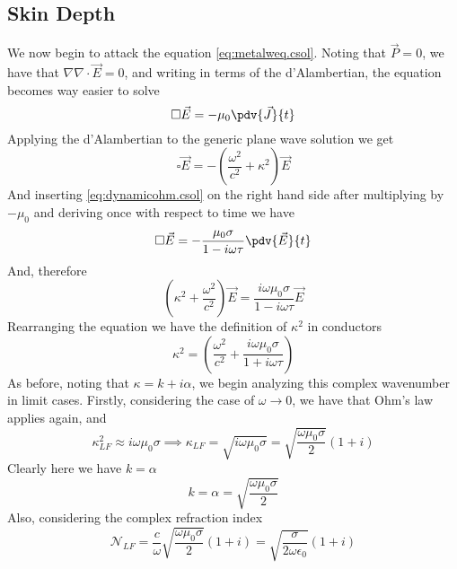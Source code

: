 \documentclass[../electromagnetism.tex]{subfiles}
\begin{document}
\subsection{Skin Depth}
We now begin to attack the equation \eqref{eq:metalweq.csol}. Noting that $\vec{P}=0$, we have that $\nabla\nabla\cdot\vec{E}=0$, and writing in terms of the d'Alambertian, the equation becomes way easier to solve
\begin{equation}
	\square\vec{E}=-\mu_0\pdv{\vec{J}}{t}
	\label{eq:metaleq.csol}
\end{equation}
Applying the d'Alambertian to the generic plane wave solution we get 
\begin{equation*}
	\square\vec{E}=-\left( \frac{\omega^2}{c^2}+\kappa^2 \right)\vec{E}
\end{equation*}
And inserting \eqref{eq:dynamicohm.csol} on the right hand side after multiplying by $-\mu_0$ and deriving once with respect to time we have
\begin{equation}
	\square\vec{E}=-\frac{\mu_0\sigma}{1-i\omega\tau}\pdv{\vec{E}}{t}
	\label{eq:pdetosolve.csol}
\end{equation}
And, therefore
\begin{equation*}
	\left( \kappa^2+\frac{\omega^2}{c^2} \right)\vec{E}=\frac{i\omega\mu_0\sigma}{1-i\omega\tau}\vec{E}
\end{equation*}
Rearranging the equation we have the definition of $\kappa^2$ in conductors
\begin{equation}
	\kappa^2=\left( \frac{\omega^2}{c^2}+\frac{i\omega\mu_0\sigma}{1+i\omega\tau} \right)
	\label{eq:kappa.csol}
\end{equation}
As before, noting that $\kappa=k+i\alpha$, we begin analyzing this complex wavenumber in limit cases. Firstly, considering the case of $\omega\to0$, we have that Ohm's law applies again, and
\begin{equation*}
	\kappa_{LF}^2\approx i\omega\mu_0\sigma\implies\kappa_{LF}=\sqrt{i\omega\mu_0\sigma}=\sqrt{\frac{\omega\mu_0\sigma}{2}}\left( 1+i \right)
\end{equation*}
Clearly here we have $k=\alpha$
\begin{equation}
	k=\alpha=\sqrt{\frac{\omega\mu_0\sigma}{2}}
	\label{eq:klf.csol}
\end{equation}
Also, considering the complex refraction index
\begin{equation*}
	\mathcal{N}_{LF}=\frac{c}{\omega}\sqrt{\frac{\omega\mu_0\sigma}{2}}(1+i)=\sqrt{\frac{\sigma}{2\omega\epsilon_0}}(1+i)
\end{equation*}
\end{document}
